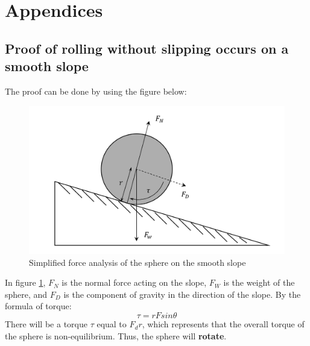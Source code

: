 \documentclass[conference]{IEEEtran}
\begin{document}
\newpage
\appendix
\section{Appendices}
    \subsection{Proof of rolling without slipping occurs on a smooth slope} \label{proofofslide}
        The proof can be done by using the figure below:
        \begin{figure}[H]
            \centering
            \includegraphics[width=0.5\linewidth]{no_friction.png}
            \caption{Simplified force analysis of the sphere on the smooth slope}
            \label{frictionless}
        \end{figure}
        In figure \ref{frictionless}, $F_N$ is the normal force acting on the slope, $F_W$ is the weight of the sphere, and $F_D$ is the component of gravity in the direction of the slope.
        By the formula of torque:
        \begin{equation}
            \tau = rFsin\theta
        \end{equation}
        There will be a torque $\tau$ equal to $F_dr$, which represents that the overall torque of the sphere is non-equilibrium. Thus, the sphere will \textbf{rotate}.
\end{document}
